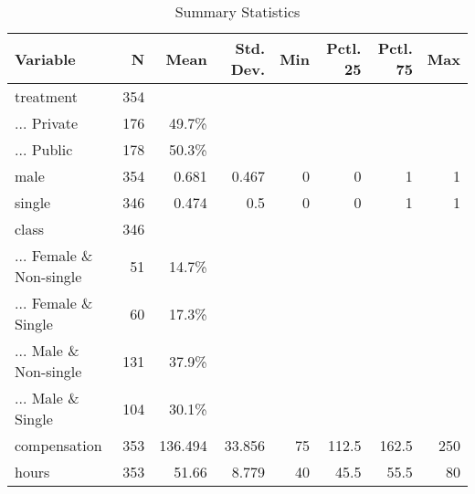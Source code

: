\begin{table}[!htbp] \centering \renewcommand*{\arraystretch}{1.1}\caption{Summary Statistics}\label{SumStats}
\begin{tabular}{lrrrrrrr}
\hline
\hline
Variable & N & Mean & Std. Dev. & Min & Pctl. 25 & Pctl. 75 & Max \\ 
\hline
treatment & 354 &  &  &  &  &  &  \\ 
... Private & 176 & 49.7\% &  &  &  &  &  \\ 
... Public & 178 & 50.3\% &  &  &  &  &  \\ 
male & 354 & 0.681 & 0.467 & 0 & 0 & 1 & 1 \\ 
single & 346 & 0.474 & 0.5 & 0 & 0 & 1 & 1 \\ 
class & 346 &  &  &  &  &  &  \\ 
... Female \& Non-single & 51 & 14.7\% &  &  &  &  &  \\ 
... Female \& Single & 60 & 17.3\% &  &  &  &  &  \\ 
... Male \& Non-single & 131 & 37.9\% &  &  &  &  &  \\ 
... Male \& Single & 104 & 30.1\% &  &  &  &  &  \\ 
compensation & 353 & 136.494 & 33.856 & 75 & 112.5 & 162.5 & 250 \\ 
hours & 353 & 51.66 & 8.779 & 40 & 45.5 & 55.5 & 80\\ 
\hline
\hline
\end{tabular}
\end{table}

